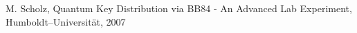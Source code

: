 \renewcommand{\refname}{Literatur und Programme}
\begin{thebibliography}{xxxxxx}
M. Scholz, Quantum Key Distribution via BB84 - An Advanced Lab Experiment, Humboldt–Universität, 2007
\end{thebibliography}